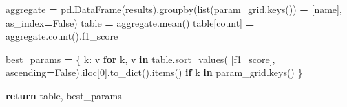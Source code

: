 \documentclass[
]{article}
\newenvironment{Shaded}{\begin{snugshade}}{\end{snugshade}}
\newcommand{\BuiltInTok}[1]{#1}
\newcommand{\ControlFlowTok}[1]{\textcolor[rgb]{0.13,0.29,0.53}{\textbf{#1}}}
\newcommand{\DecValTok}[1]{\textcolor[rgb]{0.00,0.00,0.81}{#1}}
\newcommand{\KeywordTok}[1]{\textcolor[rgb]{0.13,0.29,0.53}{\textbf{#1}}}
\newcommand{\NormalTok}[1]{#1}
\newcommand{\OperatorTok}[1]{\textcolor[rgb]{0.81,0.36,0.00}{\textbf{#1}}}
\newcommand{\StringTok}[1]{\textcolor[rgb]{0.31,0.60,0.02}{#1}}
\newcommand{\VariableTok}[1]{\textcolor[rgb]{0.00,0.00,0.00}{#1}}
\begin{document}
\begin{Shaded}
\begin{Highlighting}[]
\NormalTok{    aggregate }\OperatorTok{=}\NormalTok{ pd.DataFrame(results).groupby(}\BuiltInTok{list}\NormalTok{(param\_grid.keys()) }\OperatorTok{+}
\NormalTok{                                              [}\StringTok{\textquotesingle{}name\textquotesingle{}}\NormalTok{],}
\NormalTok{                                              as\_index}\OperatorTok{=}\VariableTok{False}\NormalTok{)}
\NormalTok{    table }\OperatorTok{=}\NormalTok{ aggregate.mean()}
\NormalTok{    table[}\StringTok{\textquotesingle{}count\textquotesingle{}}\NormalTok{] }\OperatorTok{=}\NormalTok{ aggregate.count().f1\_score}

\NormalTok{    best\_params }\OperatorTok{=}\NormalTok{ \{}
\NormalTok{        k: v}
        \ControlFlowTok{for}\NormalTok{ k, v }\KeywordTok{in}\NormalTok{ table.sort\_values(}
\NormalTok{            [}\StringTok{\textquotesingle{}f1\_score\textquotesingle{}}\NormalTok{], ascending}\OperatorTok{=}\VariableTok{False}\NormalTok{).iloc[}\DecValTok{0}\NormalTok{].to\_dict().items()}
        \ControlFlowTok{if}\NormalTok{ k }\KeywordTok{in}\NormalTok{ param\_grid.keys()}
\NormalTok{    \}}

    \ControlFlowTok{return}\NormalTok{ table, best\_params}
\end{Highlighting}
\end{Shaded}
\end{document}
